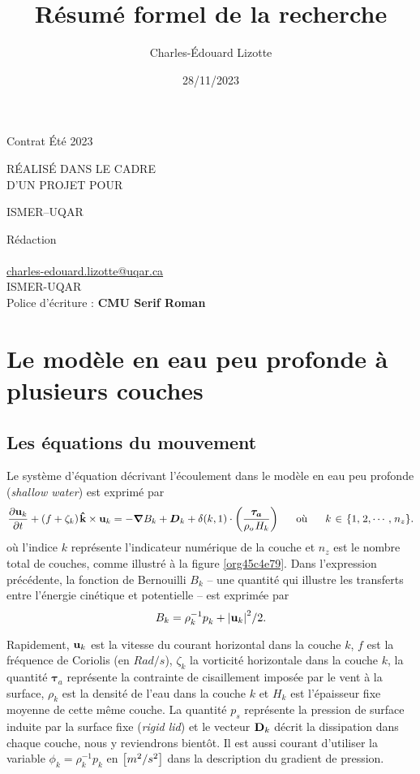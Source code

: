 \documentclass[10pt]{report}
\author{Charles-Édouard Lizotte}
\date{28/11/2023}
\title{Résumé formel de la recherche}
\makeatletter
\numberwithin{equation}{section}
\newcommand{\kvf}{\vb{\hat{k}}}
\newcommand{\uu}{\vb{u}}
\newcommand{\pt}{\hspace{1pt}} %
\newcommand{\mytitlepage}{
\begin{titlepage}
\begin{center}
{\Huge \thesubtitle \par}
\vspace{2cm}
{\Huge \MakeUppercase{\thetitle} \par}
\vspace{2cm}
RÉALISÉ DANS LE CADRE\\ D'UN PROJET POUR \par
\vspace{2cm}
{\Huge ISMER--UQAR \par}
\vspace{2cm}
{\thedate}
\end{center}
\vfill
Rédaction \\
{\theauthor}\\
\url{charles-edouard.lizotte@uqar.ca}\\
ISMER-UQAR\\
Police d'écriture : \textbf{CMU Serif Roman}
\end{titlepage}
}
\newcommand{\thesubtitle}{Contrat Été 2023}
\makeatother
\begin{document}
\mytitlepage
\tableofcontents\newpage
\chapter{Le modèle en eau peu profonde à plusieurs couches}
\label{sec:orgf3dcbc5}

\section{Les équations du mouvement}
\label{sec:org8e71771}

Le système d'équation décrivant l'écoulement dans le modèle en eau peu profonde (\emph{shallow water}) est exprimé par 
\begin{equation}
\label{eq:orgb09fa54}
   \pdv{\uu_k}{t} + \qty(f+\zeta_k)\pt \kvf\times\uu_k = -\gradient{B_k} + \boldsymbol{D}_k + \delta(k,1)\cdot \qty(\frac{\boldsymbol{\tau_a}}{\rho_o\pt H_k})
   \hspace{0.6cm} \text{où} \hspace{0.6cm} k\pt \in\pt \lbrace 1,\pt2,\cdots ,\pt n_z\rbrace.
\end{equation}
où l'indice \(k\) représente l'indicateur numérique de la couche et \(n_z\) est le nombre total de couches, comme illustré à la figure \ref{org45c4e79}.
Dans l'expression précédente, la fonction de Bernouilli \(B_k\) -- une quantité qui illustre les transferts entre l'énergie cinétique et potentielle -- est exprimée par
\begin{equation}
   B_k =  \rho_k^{-1} p_k^{} + \abs{\uu_k}^2/2.
\end{equation}

Rapidement, \(\uu_k\) est la vitesse du courant horizontal dans la couche \(k\), \(f\) est la fréquence de Coriolis (en \(Rad/s\)), \(\zeta_k\) la vorticité horizontale dans la couche \(k\), la quantité \(\boldsymbol{\tau}_a\) représente la contrainte de cisaillement imposée par le vent à la surface, \(\rho_k\) est la densité de l'eau dans la couche \(k\) et \(H_k\) est l'épaisseur fixe moyenne de cette même couche.
La quantité \(p_s\) représente la pression de surface induite par la surface fixe (\emph{rigid lid}) et le vecteur \(\vb{D}_k\) décrit la dissipation dans chaque couche, nous y reviendrons bientôt.
Il est aussi courant d'utiliser la variable \(\phi_k = \rho_k^{-1} p_k\) en \(\qty[m^2/s^2]\) dans la description du gradient de pression.\bigskip
\end{document}
